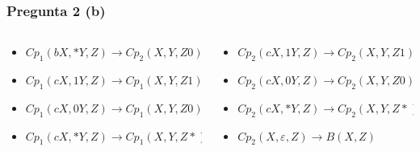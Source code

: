 \documentclass{beamer}
\begin{document}
\begin{frame}
    \frametitle{Pregunta 2 (b)}
    
    \begin{columns}
        \begin{column}{0.48\textwidth}
            \begin{itemize}
                \item $Cp_1(bX,*Y,Z) \to Cp_2(X,Y,Z0)$
                \item $Cp_1(cX,1Y,Z) \to Cp_1(X,Y,Z1)$
                \item $Cp_1(cX,0Y,Z) \to Cp_1(X,Y,Z0)$
                \item $Cp_1(cX,*Y,Z) \to Cp_1(X,Y,Z*)$
                      
            \end{itemize}
        \end{column}
        \begin{column}{0.48\textwidth}
            \begin{itemize}
                \item $Cp_2(cX,1Y,Z) \to Cp_2(X,Y,Z1)$
                \item $Cp_2(cX,0Y,Z) \to Cp_2(X,Y,Z0)$
                \item $Cp_2(cX,*Y,Z) \to Cp_2(X,Y,Z*)$
                      
                \item $Cp_2(X,\varepsilon,Z)\to B(X,Z)$
            \end{itemize}
        \end{column}
    \end{columns}
\end{frame}
\end{document}
